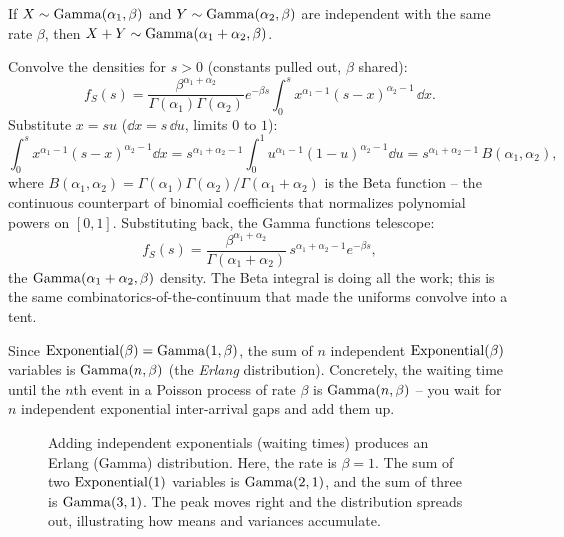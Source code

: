 \begin{theorem}
\label{ch17:thm-gamma-add}
If $X\sim\operatorname{Gamma}(\alpha_1,\beta)$ and $Y\sim\operatorname{Gamma}(\alpha_2,\beta)$ are
independent with the same rate $\beta$, then
$X+Y\sim\operatorname{Gamma}(\alpha_1+\alpha_2,\beta)$.
\end{theorem}

\begin{whybox}
Convolve the densities for $s>0$ (constants pulled out, $\beta$ shared):
\[
f_S(s) = \frac{\beta^{\alpha_1+\alpha_2}}{\Gamma(\alpha_1)\Gamma(\alpha_2)}
         e^{-\beta s}\int_0^s x^{\alpha_1-1}(s-x)^{\alpha_2-1}\,\dd x.
\]
Substitute $x=su$ ($\dd x = s\,\dd u$, limits $0$ to $1$):
\[
\int_0^s x^{\alpha_1-1}(s-x)^{\alpha_2-1}\dd x
 = s^{\alpha_1+\alpha_2-1}\int_0^1 u^{\alpha_1-1}(1-u)^{\alpha_2-1}\dd u
 = s^{\alpha_1+\alpha_2-1}\,B(\alpha_1,\alpha_2),
\]
where $B(\alpha_1,\alpha_2)=\Gamma(\alpha_1)\Gamma(\alpha_2)/\Gamma(\alpha_1+\alpha_2)$
is the Beta function -- the continuous counterpart of binomial coefficients
that normalizes polynomial powers on $[0,1]$. Substituting back, the Gamma functions telescope:
\[
f_S(s) = \frac{\beta^{\alpha_1+\alpha_2}}{\Gamma(\alpha_1+\alpha_2)}\,
         s^{\alpha_1+\alpha_2-1}e^{-\beta s},
\]
the $\operatorname{Gamma}(\alpha_1+\alpha_2,\beta)$ density. The Beta integral is doing all
the work; this is the same combinatorics-of-the-continuum that made the
uniforms convolve into a tent.
\end{whybox}

\begin{corollary}
\label{ch17:cor-erlang}
Since $\operatorname{Exponential}(\beta)=\operatorname{Gamma}(1,\beta)$, the sum of $n$ independent
$\operatorname{Exponential}(\beta)$ variables is $\operatorname{Gamma}(n,\beta)$ (the \emph{Erlang}
distribution). Concretely, the waiting time until the $n$th event in a
Poisson process of rate $\beta$ is $\operatorname{Gamma}(n,\beta)$ -- you wait for $n$
independent exponential inter-arrival gaps and add them up.
\end{corollary}

\begin{figure}[H]
\centering
{}
\caption{Adding independent exponentials (waiting times) produces an Erlang (Gamma) distribution. Here, the rate is $\beta=1$. The sum of two $\operatorname{Exponential}(1)$ variables is $\operatorname{Gamma}(2,1)$, and the sum of three is $\operatorname{Gamma}(3,1)$. The peak moves right and the distribution spreads out, illustrating how means and variances accumulate.}
\label{ch17:fig-erlang}
\end{figure}



